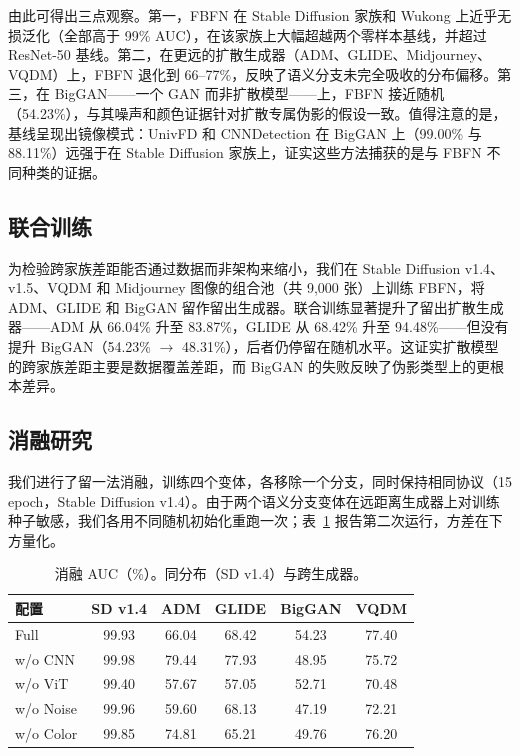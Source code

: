 \documentclass[11pt]{ctexart}
\begin{document}
由此可得出三点观察。第一，FBFN 在 Stable Diffusion 家族和 Wukong 上近乎无损泛化（全部高于 99\% AUC），在该家族上大幅超越两个零样本基线，并超过 ResNet-50 基线。第二，在更远的扩散生成器（ADM、GLIDE、Midjourney、VQDM）上，FBFN 退化到 66--77\%，反映了语义分支未完全吸收的分布偏移。第三，在 BigGAN——一个 GAN 而非扩散模型——上，FBFN 接近随机（54.23\%），与其噪声和颜色证据针对扩散专属伪影的假设一致。值得注意的是，基线呈现出镜像模式：UnivFD 和 CNNDetection 在 BigGAN 上（99.00\% 与 88.11\%）远强于在 Stable Diffusion 家族上，证实这些方法捕获的是与 FBFN 不同种类的证据。

\subsection{联合训练}

为检验跨家族差距能否通过数据而非架构来缩小，我们在 Stable Diffusion v1.4、v1.5、VQDM 和 Midjourney 图像的组合池（共 9,000 张）上训练 FBFN，将 ADM、GLIDE 和 BigGAN 留作留出生成器。联合训练显著提升了留出扩散生成器——ADM 从 66.04\% 升至 83.87\%，GLIDE 从 68.42\% 升至 94.48\%——但没有提升 BigGAN（54.23\% $\to$ 48.31\%），后者仍停留在随机水平。这证实扩散模型的跨家族差距主要是数据覆盖差距，而 BigGAN 的失败反映了伪影类型上的更根本差异。

\subsection{消融研究}

我们进行了留一法消融，训练四个变体，各移除一个分支，同时保持相同协议（15 epoch，Stable Diffusion v1.4）。由于两个语义分支变体在远距离生成器上对训练种子敏感，我们各用不同随机初始化重跑一次；表~\ref{tab:2} 报告第二次运行，方差在下方量化。

\begin{table}[h]
\centering
\caption{消融 AUC（\%）。同分布（SD v1.4）与跨生成器。}
\label{tab:2}
\begin{tabular}{lccccc}
\toprule
配置 & SD v1.4 & ADM & GLIDE & BigGAN & VQDM \\
\midrule
Full & 99.93 & 66.04 & 68.42 & 54.23 & 77.40 \\
w/o CNN & 99.98 & 79.44 & 77.93 & 48.95 & 75.72 \\
w/o ViT & 99.40 & 57.67 & 57.05 & 52.71 & 70.48 \\
w/o Noise & 99.96 & 59.60 & 68.13 & 47.19 & 72.21 \\
w/o Color & 99.85 & 74.81 & 65.21 & 49.76 & 76.20 \\
\bottomrule
\end{tabular}
\end{table}
\end{document}
